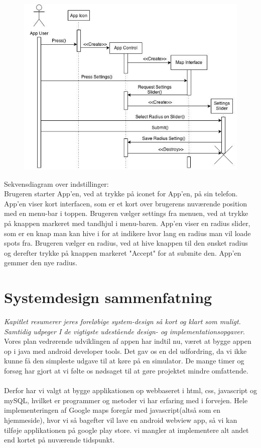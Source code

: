 \documentclass[12pt]{article}
\begin{document}
\begin{figure}[h]
\includegraphics[scale = 0.5]{sekdia3}
\end{figure}

Sekvensdiagram over indstillinger:\\
Brugeren starter App'en, ved at trykke på iconet for App'en, på sin telefon. App'en viser kort interfacen, 
som er et kort over brugerens nuværende position med en menu-bar i toppen. Brugeren vælger settings fra menuen, 
ved at trykke på knappen markeret med tandhjul i menu-baren. App'en viser en radius slider, som er en knap man kan hive i
for at indikere hvor lang en radius man vil loade spots fra. Brugeren vælger en radius, ved at hive knappen til den ønsket
radius og derefter trykke på knappen markeret "Accept" for at submite den. App'en gemmer den nye radius.

\pagebreak

\section{Systemdesign sammenfatning}
\textit{Kapitlet resumerer jeres foreløbige system-design så kort og klart som muligt. Samtidig
udpeger I de vigtigste udestående design- og implementationsopgaver}.\\

Vores plan vedrørende udviklingen af appen har indtil nu, været at bygge appen op i java med android developer tools. Det gav os en del udfordring, da vi ikke kunne få den simpleste udgave til at køre på en simulator. De mange timer og forsøg har gjort at vi følte os nødsaget til at gøre projektet mindre omfattende. 
\\\\
Derfor har vi valgt at bygge applikationen op webbaseret i html, css, javascript og mySQL, hvilket er programmer og metoder vi har erfaring med i forvejen. 
Hele implementeringen af Google maps foregår med javascript(altså som en hjemmeside), hvor vi så bagefter vil lave en android webview app, så vi kan tilføje applikationen på google play store. vi mangler at implementere alt andet end kortet på nuværende tidspunkt.
\end{document}

